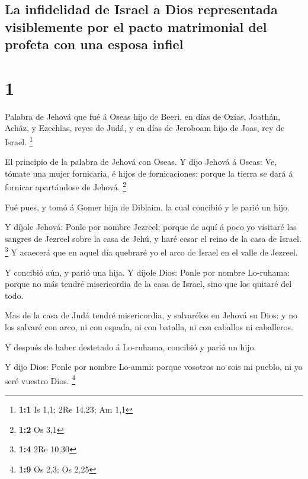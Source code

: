 \hypertarget{la-infidelidad-de-israel-a-dios-representada-visiblemente-por-el-pacto-matrimonial-del-profeta-con-una-esposa-infiel}{%
\subsection{La infidelidad de Israel a Dios representada visiblemente
por el pacto matrimonial del profeta con una esposa
infiel}\label{la-infidelidad-de-israel-a-dios-representada-visiblemente-por-el-pacto-matrimonial-del-profeta-con-una-esposa-infiel}}

\hypertarget{section}{%
\section{1}\label{section}}

 Palabra de Jehová que fué á Oseas hijo de Beeri, en días
de Ozías, Joathán, Achâz, y Ezechîas, reyes de Judá, y en días de
Jeroboam hijo de Joas, rey de Israel. \footnote{\textbf{1:1} Is 1,1; 2Re
  14,23; Am 1,1}

 El principio de la palabra de Jehová con Oseas. Y dijo
Jehová á Oseas: Ve, tómate una mujer fornicaria, é hijos de
fornicaciones: porque la tierra se dará á fornicar apartándose de
Jehová. \footnote{\textbf{1:2} Os 3,1}

 Fué pues, y tomó á Gomer hija de Diblaim, la cual
concibió y le parió un hijo.

 Y díjole Jehová: Ponle por nombre Jezreel; porque de aquí
á poco yo visitaré las sangres de Jezreel sobre la casa de Jehú, y haré
cesar el reino de la casa de Israel. \footnote{\textbf{1:4} 2Re 10,30}
 Y acaecerá que en aquel día quebraré yo el arco de Israel
en el valle de Jezreel.

 Y concibió aún, y parió una hija. Y díjole Dios: Ponle
por nombre Lo-ruhama: porque no más tendré misericordia de la casa de
Israel, sino que los quitaré del todo.

 Mas de la casa de Judá tendré misericordia, y salvarélos
en Jehová su Dios: y no los salvaré con arco, ni con espada, ni con
batalla, ni con caballos ni caballeros.

 Y después de haber destetado á Lo-ruhama, concibió y
parió un hijo.

 Y dijo Dios: Ponle por nombre Lo-ammi: porque vosotros no
sois mi pueblo, ni yo seré vuestro Dios. \footnote{\textbf{1:9} Os 2,3;
  Os 2,25}

